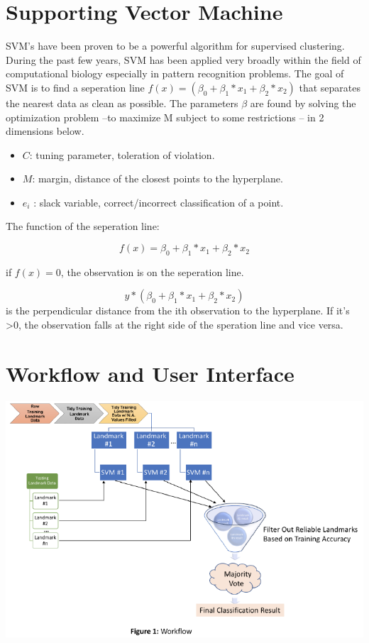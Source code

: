 \documentclass[10pt,letterpaper]{article}
\providecommand{\tightlist}{%
  \setlength{\itemsep}{0pt}\setlength{\parskip}{0pt}}
\begin{document}
\section{Supporting Vector Machine}\label{supporting-vector-machine}

SVM's have been proven to be a powerful algorithm for supervised
clustering. During the past few years, SVM has been applied very broadly
within the field of computational biology especially in pattern
recognition problems. The goal of SVM is to find a seperation line
\(f(x) = (\beta_0 + \beta_1 * x_1 + \beta_2 * x_2)\) that separates the
nearest data as clean as possible. The parameters \(\beta\) are found by
solving the optimization problem --to maximize M subject to some
restrictions -- in 2 dimensions below.

\begin{itemize}
\tightlist
\item
  \(C\): tuning parameter, toleration of violation.
\item
  \(M\): margin, distance of the closest points to the hyperplane.
\item
  \(e_i\) : slack variable, correct/incorrect classification of a point.
\end{itemize}

The function of the seperation line:

\[f(x) = \beta_0 + \beta_1 * x_1 + \beta_2 * x_2 \]

if \(f(x) = 0\), the observation is on the seperation line.

\[ y * ( \beta_0 + \beta_1 * x_1 + \beta_2 * x_2 )\] is the
perpendicular distance from the ith observation to the hyperplane. If
it's \textgreater{}0, the observation falls at the right side of the
speration line and vice versa.

\section{Workflow and User Interface}\label{workflow-and-user-interface}

\includegraphics{zebrafish_paper_files/figure-latex/unnamed-chunk-2-1.pdf}
\end{document}
